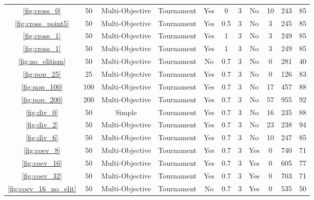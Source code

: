 \documentclass[ %
                    author={Alexander Dalton},
                supervisor={Prof. Seth Bullock},
                    degree={MEng},
                     title={Exploring Evolutionary Hardware:},
                  subtitle={Evolved Binary Arithmetic Circuits and Dynamic Problems},
                      type={research},
                      year={2018} ]{dissertation}
\begin{document}
\begin{landscape}
\begin{longtable}{cccccccc|ccc}
		\ref{fig:cross_0} & 50 & Multi-Objective\footnotemark[2] & Tournament\footnotemark[5] & Yes & 0 & 3 & No & 10 & 243 & 85 \\
		\ref{fig:cross_point5} & 50 & Multi-Objective\footnotemark[2] & Tournament\footnotemark[5] & Yes & 0.5 & 3 & No & 3 & 245 & 85 \\
		\ref{fig:cross_1} & 50 & Multi-Objective\footnotemark[2] & Tournament\footnotemark[5] & Yes & 1 & 3 & No & 3 & 249 & 85 \\
		\ref{fig:cross_1} & 50 & Multi-Objective\footnotemark[2] & Tournament\footnotemark[5] & Yes & 1 & 3 & No & 3 & 249 & 85 \\
		\ref{fig:no_elitism} & 50 & Multi-Objective\footnotemark[2] & Tournament\footnotemark[5] & No & 0.7 & 3 & No & 0 & 281 & 40 \\
		\ref{fig:pop_25} & 25 & Multi-Objective\footnotemark[2] & Tournament\footnotemark[5] & Yes & 0.7 & 3 & No & 0 & 126 & 83 \\
		\ref{fig:pop_100} & 100 & Multi-Objective\footnotemark[2] & Tournament\footnotemark[5] & Yes & 0.7 & 3 & No & 17 & 457 & 88 \\
		\ref{fig:pop_200} & 200 & Multi-Objective\footnotemark[2] & Tournament\footnotemark[5] & Yes & 0.7 & 3 & No & 57 & 955 & 92 \\
		\ref{fig:div_0} & 50 & Simple & Tournament\footnotemark[5] & Yes & 0.7 & 3 & No & 16 & 235 & 88 \\
		\ref{fig:div_2} & 50 & Multi-Objective\footnotemark[1] & Tournament\footnotemark[5] & Yes & 0.7 & 3 & No & 23 & 238 & 94 \\
		\ref{fig:div_6} & 50 & Multi-Objective\footnotemark[3] & Tournament\footnotemark[5] & Yes & 0.7 & 3 & No & 10 & 247 & 85 \\
		\ref{fig:coev_8} & 50 & Multi-Objective\footnotemark[1] & Tournament\footnotemark[5] & Yes & 0.7 & 3 & Yes\footnotemark[8] & 0 & 740 & 71 \\
		\ref{fig:coev_16} & 50 & Multi-Objective\footnotemark[1] & Tournament\footnotemark[5] & Yes & 0.7 & 3 & Yes\footnotemark[9] & 0 & 605 & 77 \\
		\ref{fig:coev_32} & 50 & Multi-Objective\footnotemark[1] & Tournament\footnotemark[5] & Yes & 0.7 & 3 & Yes\footnotemark[10] & 0 & 703 & 71 \\
		\ref{fig:coev_16_no_elit} & 50 & Multi-Objective\footnotemark[1] & Tournament\footnotemark[5] & No & 0.7 & 3 & Yes\footnotemark[9] & 0 & 535 & 50 \\
		\bottomrule

	\end{longtable}
\end{landscape}

\end{document}

